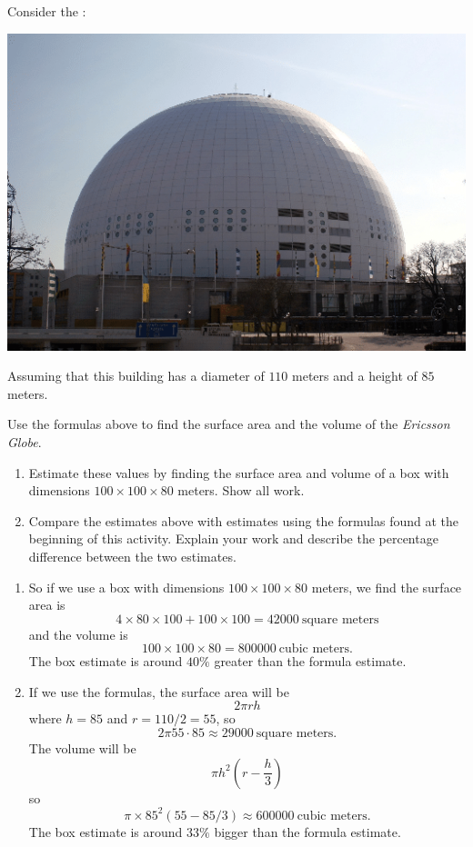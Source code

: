 \documentclass[handout,nooutcomes,noauthor,hints1,12pt]{ximera}
\begin{document}
\begin{question} \label{FG1:1}
  Consider the :
   \begin{center}
    \includegraphics[width=.4\textwidth]{dome.png} %
   \end{center}
   Assuming that this building has a diameter of $110$ meters and a
   height of $85$ meters.
   
   Use the formulas above to find the surface area
   and the volume of the \textit{Ericsson Globe}.
\begin{enumerate}
\item Estimate these values by finding the surface area and volume of
  a box with dimensions $100\times 100 \times 80$ meters. Show all work.
\item Compare the estimates above with estimates using the formulas
  found at the beginning of this activity. Explain your work and
  describe the percentage difference between the two estimates.
\end{enumerate}
\begin{freeResponse}
  \begin{enumerate}
  \item So if we use a box with dimensions $100\times 100 \times 80$ meters,
    we find the surface area is
    \[
    4\times 80 \times 100 +100\times 100= 42000~\text{square meters}
    \]
    and the volume is
    \[
    100\times 100 \times 80 = 800000~\text{cubic meters.}
    \]
    The box estimate is around $40\%$ greater than the formula
    estimate.
  \item If we use the formulas, the surface area will be
    \[
    2\pi rh
    \]
    where $h=85$ and $r= 110/2 = 55$, so
    \[
    2\pi 55\cdot 85 \approx  29000~\text{square meters}.
    \]
    The volume will be
    \[
    \pi h^2 \left( r- \frac{h}{3}\right)
    \]
    so
    \[
    \pi \times 85^2 (55 - 85/3) \approx 600000 ~\text{cubic meters.}
    \]
    The box estimate is around $33\%$ bigger than the formula
    estimate.
  \end{enumerate}
\end{freeResponse}
   \end{question}
\mynewpage
\end{document}

